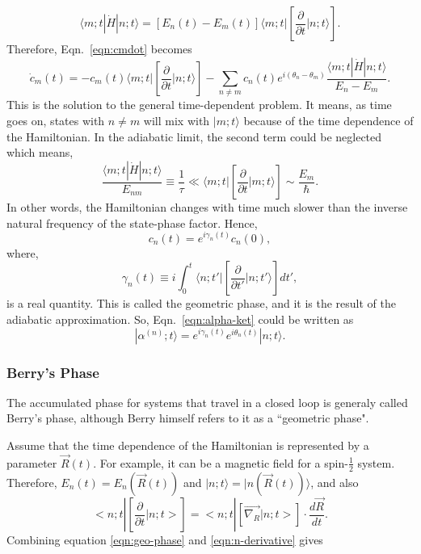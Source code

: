 \begin{equation}
\langle m;t|\dot{H}|n;t \rangle =\left[ E_n(t)-E_m(t)\right] \langle m;t| \left[ \frac{\partial}{\partial t} |n;t \rangle \right] .
\end{equation}
%
Therefore, Eqn.~\ref{eqn:cmdot} becomes
%
\begin{equation}
\dot{c}_m(t) =-c_m(t) \langle m;t| \left[ \frac{\partial}{\partial t} |n;t \rangle \right]-\sum_{n\neq m}c_n(t) e^{i(\theta_n-\theta_m)} \frac{ \langle m;t|\dot{H}|n;t \rangle }{E_n-E_m} .
\end{equation}
%
This is the solution to the general time-dependent problem. It
means, as time goes on, states with $n \neq m$ will mix with
$|m;t \rangle $ because of the time dependence of the Hamiltonian. In
the adiabatic limit, the second term could be neglected which means,
%
\begin{equation}
\frac{ \langle m;t|\dot{H}|n;t \rangle }{E_{nm}} \equiv \frac{1}{\tau} \ll \langle m;t| \left[ \frac{\partial}{\partial t} |m;t \rangle \right] \sim \frac{E_m}{\hbar} .
\end{equation}
%
In other words, the Hamiltonian changes with time much slower than the
inverse natural frequency of the state-phase factor.  Hence,
%
\begin{equation}
c_n(t)=e^{i \gamma_n(t)} c_n(0) ,
\end{equation}
%
where,
%
\begin{equation}
\label{eqn:geo-phase}
\gamma_n(t) \equiv i \int_0^t \langle n;t'| \left[ \frac{\partial}{\partial t'} |n;t' \rangle   \right] dt' ,
\end{equation}
is a real quantity. This is called the geometric phase, and it is the
result of the adiabatic approximation.  So, Eqn.~\ref{eqn:alpha-ket}
could be written as
%
\begin{equation}
|\alpha^{(n)};t \rangle= e^{i \gamma_n(t)} e^{i \theta_n(t)} |n;t \rangle .
\end{equation}
\subsubsection{Berry's Phase}

The accumulated phase for systems that travel in a closed loop is
generaly called Berry's phase, although Berry himself refers to it as
a ``geometric phase".

Assume that the time dependence of the Hamiltonian is represented by a
parameter $\vec{R}(t)$. For example, it can be a magnetic field for a
spin-$\frac{1}{2}$ system. Therefore, $E_n(t)=E_n(\vec{R}(t))$ and
$|n;t \rangle =|n(\vec{R}(t))\rangle$, and also
%
\begin{equation}
\label{eqn:n-derivative}
<n;t| \left[\frac{\partial}{\partial t} |n;t>\right]=<n;t|\left[\vec{\nabla_R}|n;t>\right]\cdot\frac{d\vec{R}}{dt} .
\end{equation}
%
Combining equation \ref{eqn:geo-phase} and \ref{eqn:n-derivative} gives
 
